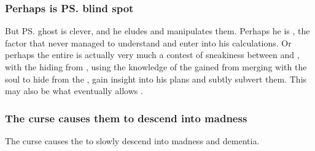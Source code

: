 \subsubsection{Perhaps \Nexagglachel{} is \ps{\Daggerrain}{} blind spot}
But \ps{\Nexagglachel}{} ghost is clever, and he eludes and manipulates them. 
Perhaps he is , the factor that \Daggerrain{} never managed to understand and enter into his calculations. 
Or perhaps the entire \feud{} is actually very much a contest of sneakiness between \Nexagglachel{} and \Daggerrain, with the \dragonlord{} hiding from \Daggerrain, using the knowledge of the \banes{} gained from merging with the \resphan{} soul to hide from the \banelord{}, gain insight into his plans and subtly subvert them. 
This may also be what eventually allows .





\subsubsection{The curse causes them to descend into madness}
The curse causes the \satharioth{} to slowly descend into madness and dementia. 


